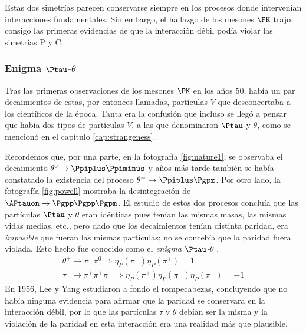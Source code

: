 Estas dos simetrías parecen conservarse siempre en los procesos donde intervenían interacciones fundamentales. Sin embargo, el hallazgo de los mesones $\PK$ trajo consigo las primeras evidencias de que la interacción débil podía violar las simetrías P y C.


\subsubsection{Enigma $\Ptau$-$\theta$}
Tras las primeras observaciones de los mesones $\PK$ en los años 50, había un par decaimientos de estas, por entonces llamadas, partículas $V$ que desconcertaba a los científicos de la época. Tanta era la confusión que incluso se llegó a pensar que había dos tipos de partículas $V$, a las que denominaron $\Ptau$ y $\theta$, como se mencionó en el capítulo \ref{cap:strangeness}. 

Recordemos que, por una parte, en la fotografía \ref{fig:nature1}, se observaba el decaimiento $\theta^{0} \rightarrow \Ppiplus\Ppiminus$ y años más tarde también se había constatado la existencia del proceso $\theta^{+} \rightarrow \Ppiplus\Pgpz$. Por otro lado, la fotografía \ref{fig:powell} mostraba la desintegración de $\APtauon \rightarrow \Pgpp\Pgpp\Pgpm$.  El estudio de estos dos procesos concluía que las partículas $\Ptau$ y $\theta$ eran idénticas pues tenían las mismas masas, las mismas vidas medias, etc., pero dado que los decaimientos tenían distinta paridad, era \textit{imposible} que fueran las mismas partículas; no se concebía que la paridad fuera violada. Esto hecho fue conocido como el \textit{enigma $\Ptau$-$\theta$} \cite{Ferbel}.
\begin{equation}
\begin{gathered}
\theta^{+} \rightarrow \pi^{+}\pi^{0} \Rightarrow \eta_{P}\left(\pi^{+}\right) \eta_{P}\left(\pi^{+}\right) = 1 \\ 
\tau^{+} \rightarrow \pi^{+}\pi^{+}\pi^{-} \Rightarrow \eta_{P}\left(\pi^{+}\right) \eta_{P}\left(\pi^{+}\right) \eta_{P}\left(\pi^{-}\right) = -1
\end{gathered}
\end{equation}
En 1956, Lee y Yang estudiaron a fondo el rompecabezas, concluyendo que no había ninguna evidencia para afirmar que la paridad se conservara en la interacción débil, por lo que las partículas $\tau$ y $\theta$ debían ser la misma y la violación de la paridad en esta interacción era una realidad más que plausible. 

